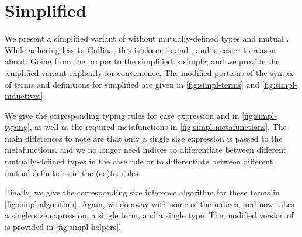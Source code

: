 \section{Simplified \titlelang}
We present a simplified variant of \lang without mutually-defined \coinductive types and mutual \cofixpoints.
While adhering less to Gallina, this is closer to \CIChatminus and \CIChat, and is easier to reason about.
Going from the proper \lang to the simplified \lang is simple, and we provide the simplified variant explicitly for convenience.
The modified portions of the syntax of terms and \coinductive definitions for simplified \lang are given in \autoref{fig:simpl-terms} and \autoref{fig:simpl-inductives}.



We give the corresponding typing rules for case expression and \cofixpoints in \autoref{fig:simpl-typing}, as well as the required metafunctions in \autoref{fig:simpl-metafunctions}. The main differences to note are that only a single size expression is passed to the metafunctions, and we no longer need indices to differentiate between different mutually-defined \coinductive types in the case rule or to differentiate between different mutual \cofixpoint definitions in the (co)fix rules.



Finally, we give the corresponding size inference algorithm for these terms in \autoref{fig:simpl-algorithm}. Again, we do away with some of the indices, and \RecCheckLoop now takes a single size expression, a single term, and a single type.
The modified version of \RecCheckLoop is provided in \autoref{fig:simpl-helpers}.





